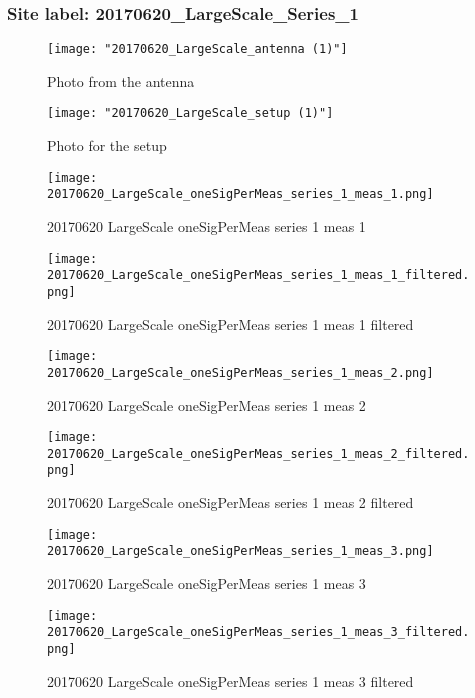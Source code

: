 \subsubsection{Site label: 20170620\_LargeScale\_Series\_1}
\begin{figure}[ht] \caption{Photo from the antenna}
\texttt{[image: "20170620\_LargeScale\_antenna (1)"]}\centering\end{figure}
\begin{figure}[ht] \caption{Photo for the setup}
\texttt{[image: "20170620\_LargeScale\_setup (1)"]}\centering\end{figure}
\begin{figure}[ht] \caption{20170620 LargeScale oneSigPerMeas series 1 meas 1}
\texttt{[image: 20170620\_LargeScale\_oneSigPerMeas\_series\_1\_meas\_1.png]}\centering\end{figure}
\begin{figure}[ht] \caption{20170620 LargeScale oneSigPerMeas series 1 meas 1 filtered}
\texttt{[image: 20170620\_LargeScale\_oneSigPerMeas\_series\_1\_meas\_1\_filtered.png]}\centering\end{figure}
\begin{figure}[ht] \caption{20170620 LargeScale oneSigPerMeas series 1 meas 2}
\texttt{[image: 20170620\_LargeScale\_oneSigPerMeas\_series\_1\_meas\_2.png]}\centering\end{figure}
\begin{figure}[ht] \caption{20170620 LargeScale oneSigPerMeas series 1 meas 2 filtered}
\texttt{[image: 20170620\_LargeScale\_oneSigPerMeas\_series\_1\_meas\_2\_filtered.png]}\centering\end{figure}
\begin{figure}[ht] \caption{20170620 LargeScale oneSigPerMeas series 1 meas 3}
\texttt{[image: 20170620\_LargeScale\_oneSigPerMeas\_series\_1\_meas\_3.png]}\centering\end{figure}
\begin{figure}[ht] \caption{20170620 LargeScale oneSigPerMeas series 1 meas 3 filtered}
\texttt{[image: 20170620\_LargeScale\_oneSigPerMeas\_series\_1\_meas\_3\_filtered.png]}\centering\end{figure}
\clearpage
